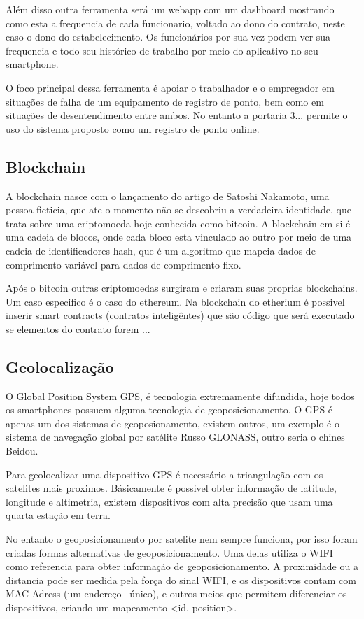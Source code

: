 \documentclass[12pt,openright,twoside,a4paper,english, brazil]{abntex2} %
\begin{document}
Além disso outra ferramenta será um webapp com um dashboard mostrando como esta a frequencia de cada funcionario, voltado ao dono do contrato, neste caso o dono do estabelecimento. Os funcionários por sua vez podem ver sua frequencia e todo seu histórico de trabalho por meio do aplicativo no seu smartphone.

O foco principal dessa ferramenta é apoiar o trabalhador e o empregador em situações de falha de um equipamento de registro de ponto, bem como em situações de desentendimento entre ambos. No entanto a portaria 3... permite o uso do sistema proposto como um registro de ponto online.


\subsection{Blockchain}

A blockchain nasce com o lançamento do artigo de Satoshi Nakamoto, uma pessoa ficticia, que ate o momento não se descobriu a verdadeira identidade, que trata sobre uma criptomoeda hoje conhecida como bitcoin. A blockchain em si é uma cadeia de blocos, onde cada bloco esta vinculado ao outro por meio de uma cadeia de identificadores hash, que é um algoritmo que mapeia dados de comprimento variável para dados de comprimento fixo. 

Após o bitcoin outras criptomoedas surgiram e criaram suas proprias blockchains. Um caso especifico é o caso do ethereum. Na blockchain do etherium é possivel inserir smart contracts (contratos inteligêntes) que são código que será executado se elementos do contrato forem ...

\subsection{Geolocalização}

O Global Position System \gls{GPS}, é tecnologia extremamente difundida, hoje todos os smartphones possuem alguma tecnologia de geoposicionamento. O \gls{GPS} é apenas um dos sistemas de geoposionamento, existem outros, um exemplo é o sistema de navegação global por satélite Russo \gls{GLONASS}, outro seria o chines \gls{Beidou}.

Para geolocalizar uma dispositivo \gls{GPS} é necessário a triangulação com os satelites mais proximos. Básicamente é possivel obter informação de latitude, longitude e altimetria, existem dispositivos com alta precisão que usam uma quarta estação em terra.

No entanto o geoposicionamento por satelite nem sempre funciona, por isso foram criadas formas alternativas de geoposicionamento. Uma delas utiliza o \gls{WIFI} como referencia para obter informação de geoposicionamento. A proximidade ou a distancia pode ser medida pela força do sinal WIFI, e os dispositivos contam com MAC Adress (um endereço  único), e outros meios que permitem diferenciar os dispositivos, criando um mapeamento <id, position>.
\end{document}
